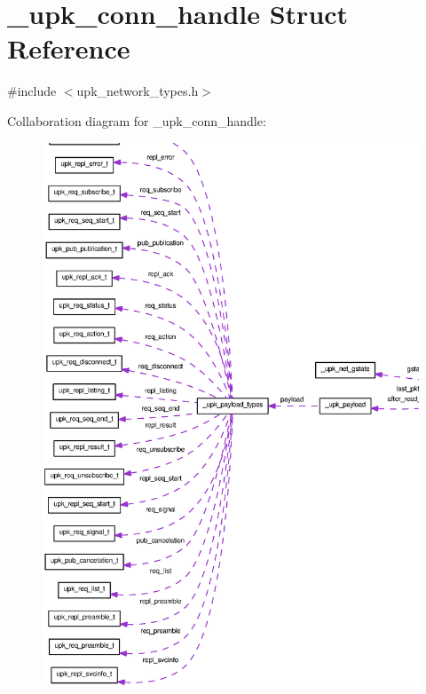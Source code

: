 \section{\_\-upk\_\-conn\_\-handle Struct Reference}
\label{struct__upk__conn__handle}


{\ttfamily \#include $<$upk\_\-network\_\-types.h$>$}



Collaboration diagram for \_\-upk\_\-conn\_\-handle:\nopagebreak
\begin{figure}[H]
\begin{center}
\leavevmode
\includegraphics[width=400pt]{struct__upk__conn__handle__coll__graph}
\end{center}
\end{figure}

